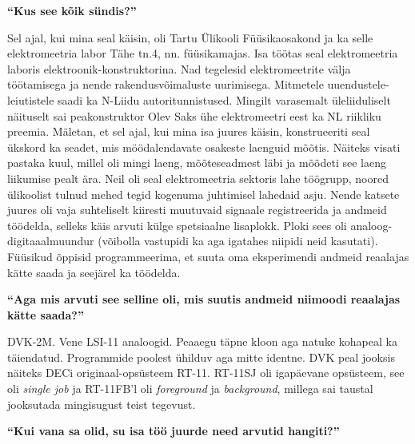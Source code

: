 \textbf{\enquote{Kus see kõik sündis?}}

Sel ajal, kui mina seal käisin, oli Tartu Ülikooli
Füüsikaosakond ja ka selle elektromeetria labor
Tähe tn.4, nn. füüsikamajas. Isa töötas seal elektromeetria laboris
elektroonik-konstruktorina. Nad tegelesid elektromeetrite välja töötamisega ja
nende rakendusvõimaluste uurimisega. Mitmetele uuendustele-leiutistele saadi ka
N-Liidu autoritunnistused. Mingilt varasemalt üleliiduliselt näituselt sai
peakonstruktor Olev Saks ühe elektromeetri eest ka NL riikliku preemia.
Mäletan, et sel ajal, kui mina isa juures käisin, konstrueeriti seal ükskord ka
seadet, mis möödalendavate osakeste laenguid mõõtis. Näiteks visati pastaka
kuul, millel oli mingi laeng, mõõteseadmest läbi ja mõõdeti see laeng liikumise
pealt ära. Neil oli seal elektromeetria sektoris lahe töögrupp, noored
ülikoolist tulnud mehed tegid kogenuma juhtimisel lahedaid asju. Nende katsete
juures oli vaja suhteliselt kiiresti muutuvaid signaale registreerida ja
andmeid töödelda, selleks käis arvuti külge spetsiaalne lisaplokk. Ploki sees
oli analoog-digitaaalmuundur (võibolla vastupidi ka aga igatahes niipidi neid
kasutati). Füüsikud õppisid programmeerima, et suuta oma eksperimendi andmeid
reaalajas kätte saada ja seejärel ka töödelda.

\textbf{\enquote{Aga mis arvuti see selline oli, mis suutis andmeid niimoodi
reaalajas kätte saada?}}

DVK-2M. Vene LSI-11
analoogid. Peaaegu täpne kloon aga natuke kohapeal ka täiendatud. Programmide
poolest ühilduv aga mitte identne. DVK peal jooksis näiteks DECi
originaal-opsüsteem RT-11. RT-11SJ oli igapäevane opsüsteem, see
oli \emph{single job} ja RT-11FB'l oli \emph{foreground} ja \emph{background},
millega sai taustal jooksutada mingisugust teist tegevust.

\textbf{\enquote{Kui vana sa olid, su isa töö juurde need arvutid hangiti?}}

